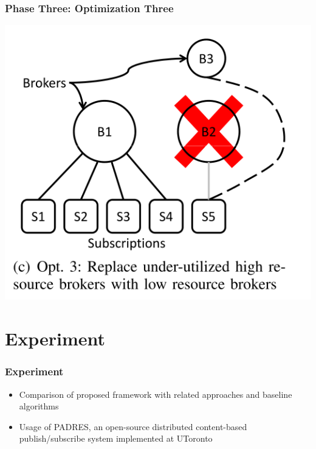 \documentclass{beamer}
\begin{document}
\begin{frame}
\frametitle{Phase Three: Optimization Three}
\includegraphics[scale=0.5]{opt_three.png}
\end{frame}

\section{Experiment}
\begin{frame}
\frametitle{Experiment}
\begin{itemize}
\item Comparison of proposed framework with related approaches and baseline algorithms
\item Usage of PADRES, an open-source distributed content-based publish/subscribe system implemented at UToronto

\end{itemize}
\end{frame}
\end{document}
